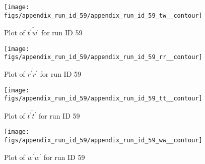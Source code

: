\begin{figure}[H]
\centering
\texttt{[image: figs/appendix\_run\_id\_59/appendix\_run\_id\_59\_tw\_\_contour]}
\caption{Plot of $\overline{t^\prime w^\prime}$ for run ID 59}
\label{fig:appendix_run_id_59_tw__contour}
\end{figure}


\begin{figure}[H]
\centering
\texttt{[image: figs/appendix\_run\_id\_59/appendix\_run\_id\_59\_rr\_\_contour]}
\caption{Plot of $\overline{r^\prime r^\prime}$ for run ID 59}
\label{fig:appendix_run_id_59_rr__contour}
\end{figure}


\begin{figure}[H]
\centering
\texttt{[image: figs/appendix\_run\_id\_59/appendix\_run\_id\_59\_tt\_\_contour]}
\caption{Plot of $\overline{t^\prime t^\prime}$ for run ID 59}
\label{fig:appendix_run_id_59_tt__contour}
\end{figure}


\begin{figure}[H]
\centering
\texttt{[image: figs/appendix\_run\_id\_59/appendix\_run\_id\_59\_ww\_\_contour]}
\caption{Plot of $\overline{w^\prime w^\prime}$ for run ID 59}
\label{fig:appendix_run_id_59_ww__contour}
\end{figure}



